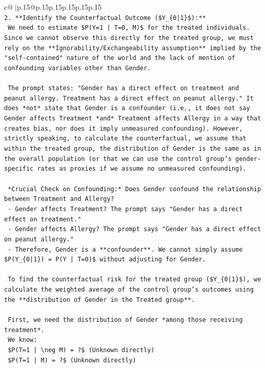 \documentclass{article}
\begin{document}
{\begin{supertabular}{c@{$\;$}|p{.15\linewidth}@{}p{.15\linewidth}p{.15\linewidth}p{.15\linewidth}p{.15\linewidth}p{.15\linewidth}}
{{{\\ 
\texttt{2.  **Identify the Counterfactual Outcome (\$Y\_\{0|1\}\$):**} \\
\texttt{    We need to estimate \$P(Y=1 | T=0, M)\$ for the treated individuals. Since we cannot observe this directly for the treated group, we must rely on the **Ignorability/Exchangeability assumption** implied by the "self{-}contained" nature of the world and the lack of mention of confounding variables other than Gender.} \\
\\ 
\texttt{    The prompt states: "Gender has a direct effect on treatment and peanut allergy. Treatment has a direct effect on peanut allergy." It does *not* state that Gender is a confounder (i.e., it does not say Gender affects Treatment *and* Treatment affects Allergy in a way that creates bias, nor does it imply unmeasured confounding). However, strictly speaking, to calculate the counterfactual, we assume that within the treated group, the distribution of Gender is the same as in the overall population (or that we can use the control group's gender{-}specific rates as proxies if we assume no unmeasured confounding).} \\
\\ 
\texttt{    *Crucial Check on Confounding:* Does Gender confound the relationship between Treatment and Allergy?} \\
\texttt{    {-} Gender affects Treatment? The prompt says "Gender has a direct effect on treatment."} \\
\texttt{    {-} Gender affects Allergy? The prompt says "Gender has a direct effect on peanut allergy."} \\
\texttt{    {-} Therefore, Gender is a **confounder**. We cannot simply assume \$P(Y\_\{0|1\}) = P(Y | T=0)\$ without adjusting for Gender.} \\
\\ 
\texttt{    To find the counterfactual risk for the treated group (\$Y\_\{0|1\}\$), we calculate the weighted average of the control group's outcomes using the **distribution of Gender in the Treated group**.} \\
\\ 
\texttt{    First, we need the distribution of Gender *among those receiving treatment*.} \\
\texttt{    We know:} \\
\texttt{    \$P(T=1 | \textbackslash{}neg M) = ?\$ (Unknown directly)} \\
\texttt{    \$P(T=1 | M) = ?\$ (Unknown directly)} \\
}}}
\end{supertabular}}
\end{document}
